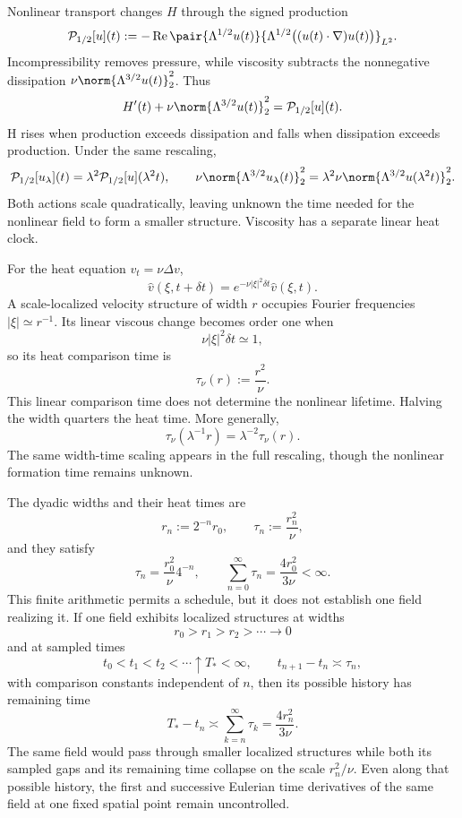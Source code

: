 Nonlinear transport changes \(H\) through the signed production
\[
  \mathcal P_{1/2}[u](t)
  :=
  -\operatorname{Re}
  \pair
    {\Lambda^{1/2}u(t)}
    {\Lambda^{1/2}\bigl((u(t)\cdot\nabla)u(t)\bigr)}_{L^2}.
\]
Incompressibility removes pressure, while viscosity subtracts the nonnegative dissipation \(\nu\norm{\Lambda^{3/2}u(t)}_2^2\).
Thus
\[
  H'(t)
  +
  \nu\norm{\Lambda^{3/2}u(t)}_2^2
  =
  \mathcal P_{1/2}[u](t).
\]
H rises when production exceeds dissipation and falls when dissipation exceeds production.
Under the same rescaling,
\[
  \mathcal P_{1/2}[u_\lambda](t)
  =
  \lambda^2\mathcal P_{1/2}[u](\lambda^2t),
  \qquad
  \nu\norm{\Lambda^{3/2}u_\lambda(t)}_2^2
  =
  \lambda^2\nu\norm{\Lambda^{3/2}u(\lambda^2t)}_2^2.
\]
Both actions scale quadratically, leaving unknown the time needed for the nonlinear field to form a smaller structure.
Viscosity has a separate linear heat clock.


For the heat equation \(v_t=\nu\Delta v\),
\[
  \widehat v(\xi,t+\delta t)
  =
  e^{-\nu|\xi|^2\delta t}\widehat v(\xi,t).
\]
A scale-localized velocity structure of width \(r\) occupies Fourier frequencies \(|\xi|\simeq r^{-1}\).
Its linear viscous change becomes order one when
\[
  \nu|\xi|^2\delta t\simeq1,
\]
so its heat comparison time is
\[
  \tau_\nu(r)
  :=
  \frac{r^2}{\nu}.
\]
This linear comparison time does not determine the nonlinear lifetime.
Halving the width quarters the heat time.
More generally,
\[
  \tau_\nu(\lambda^{-1}r)
  =
  \lambda^{-2}\tau_\nu(r).
\]
The same width-time scaling appears in the full \NavierStokes{} rescaling, though the nonlinear formation time remains unknown.


The dyadic widths and their heat times are
\[
  r_n:=2^{-n}r_0,
  \qquad
  \tau_n:=\frac{r_n^2}{\nu},
\]
and they satisfy
\[
  \tau_n
  =
  \frac{r_0^2}{\nu}4^{-n},
  \qquad
  \sum_{n=0}^{\infty}\tau_n
  =
  \frac{4r_0^2}{3\nu}
  <
  \infty.
\]
This finite arithmetic permits a schedule, but it does not establish one field realizing it.
If one \NavierStokes{} field exhibits localized structures at widths
\[
  r_0>r_1>r_2>\cdots\longrightarrow0
\]
and at sampled times
\[
  t_0<t_1<t_2<\cdots\uparrow T_*<\infty,
  \qquad
  t_{n+1}-t_n\asymp\tau_n,
\]
with comparison constants independent of \(n\), then its possible history has remaining time
\[
  T_*-t_n
  \asymp
  \sum_{k=n}^{\infty}\tau_k
  =
  \frac{4r_n^2}{3\nu}.
\]
The same field would pass through smaller localized structures while both its sampled gaps and its remaining time collapse on the scale \(r_n^2/\nu\).
Even along that possible history, the first and successive Eulerian time derivatives of the same field at one fixed spatial point remain uncontrolled.
